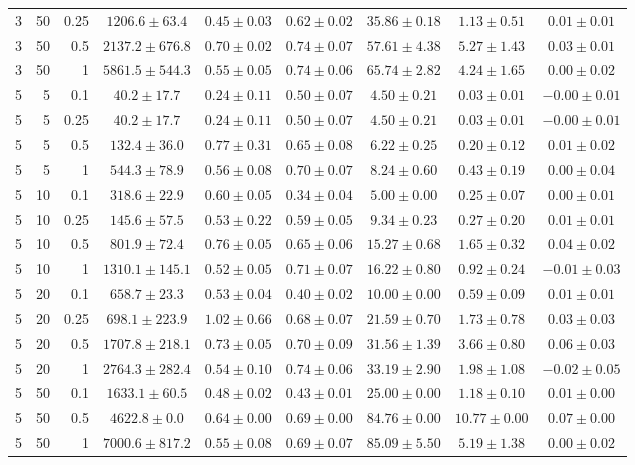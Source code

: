 \begin{table}[htbp]
\begin{tabular}{@{}rrrcccccc@{}}
3 & 50 & 0.25 & $1206.6 \pm 63.4$ & $0.45 \pm 0.03$ & $0.62 \pm 0.02$ & $35.86 \pm 0.18$ & $1.13 \pm 0.51$ & $0.01 \pm 0.01$ \\
3 & 50 & 0.5 & $2137.2 \pm 676.8$ & $0.70 \pm 0.02$ & $0.74 \pm 0.07$ & $57.61 \pm 4.38$ & $5.27 \pm 1.43$ & $0.03 \pm 0.01$ \\
3 & 50 & 1 & $5861.5 \pm 544.3$ & $0.55 \pm 0.05$ & $0.74 \pm 0.06$ & $65.74 \pm 2.82$ & $4.24 \pm 1.65$ & $0.00 \pm 0.02$ \\
\midrule
5 & 5 & 0.1 & $40.2 \pm 17.7$ & $0.24 \pm 0.11$ & $0.50 \pm 0.07$ & $4.50 \pm 0.21$ & $0.03 \pm 0.01$ & $-0.00 \pm 0.01$ \\
5 & 5 & 0.25 & $40.2 \pm 17.7$ & $0.24 \pm 0.11$ & $0.50 \pm 0.07$ & $4.50 \pm 0.21$ & $0.03 \pm 0.01$ & $-0.00 \pm 0.01$ \\
5 & 5 & 0.5 & $132.4 \pm 36.0$ & $0.77 \pm 0.31$ & $0.65 \pm 0.08$ & $6.22 \pm 0.25$ & $0.20 \pm 0.12$ & $0.01 \pm 0.02$ \\
5 & 5 & 1 & $544.3 \pm 78.9$ & $0.56 \pm 0.08$ & $0.70 \pm 0.07$ & $8.24 \pm 0.60$ & $0.43 \pm 0.19$ & $0.00 \pm 0.04$ \\
5 & 10 & 0.1 & $318.6 \pm 22.9$ & $0.60 \pm 0.05$ & $0.34 \pm 0.04$ & $5.00 \pm 0.00$ & $0.25 \pm 0.07$ & $0.00 \pm 0.01$ \\
5 & 10 & 0.25 & $145.6 \pm 57.5$ & $0.53 \pm 0.22$ & $0.59 \pm 0.05$ & $9.34 \pm 0.23$ & $0.27 \pm 0.20$ & $0.01 \pm 0.01$ \\
5 & 10 & 0.5 & $801.9 \pm 72.4$ & $0.76 \pm 0.05$ & $0.65 \pm 0.06$ & $15.27 \pm 0.68$ & $1.65 \pm 0.32$ & $0.04 \pm 0.02$ \\
5 & 10 & 1 & $1310.1 \pm 145.1$ & $0.52 \pm 0.05$ & $0.71 \pm 0.07$ & $16.22 \pm 0.80$ & $0.92 \pm 0.24$ & $-0.01 \pm 0.03$ \\
5 & 20 & 0.1 & $658.7 \pm 23.3$ & $0.53 \pm 0.04$ & $0.40 \pm 0.02$ & $10.00 \pm 0.00$ & $0.59 \pm 0.09$ & $0.01 \pm 0.01$ \\
5 & 20 & 0.25 & $698.1 \pm 223.9$ & $1.02 \pm 0.66$ & $0.68 \pm 0.07$ & $21.59 \pm 0.70$ & $1.73 \pm 0.78$ & $0.03 \pm 0.03$ \\
5 & 20 & 0.5 & $1707.8 \pm 218.1$ & $0.73 \pm 0.05$ & $0.70 \pm 0.09$ & $31.56 \pm 1.39$ & $3.66 \pm 0.80$ & $0.06 \pm 0.03$ \\
5 & 20 & 1 & $2764.3 \pm 282.4$ & $0.54 \pm 0.10$ & $0.74 \pm 0.06$ & $33.19 \pm 2.90$ & $1.98 \pm 1.08$ & $-0.02 \pm 0.05$ \\
5 & 50 & 0.1 & $1633.1 \pm 60.5$ & $0.48 \pm 0.02$ & $0.43 \pm 0.01$ & $25.00 \pm 0.00$ & $1.18 \pm 0.10$ & $0.01 \pm 0.00$ \\
5 & 50 & 0.5 & $4622.8 \pm 0.0$ & $0.64 \pm 0.00$ & $0.69 \pm 0.00$ & $84.76 \pm 0.00$ & $10.77 \pm 0.00$ & $0.07 \pm 0.00$ \\
5 & 50 & 1 & $7000.6 \pm 817.2$ & $0.55 \pm 0.08$ & $0.69 \pm 0.07$ & $85.09 \pm 5.50$ & $5.19 \pm 1.38$ & $0.00 \pm 0.02$ \\
\bottomrule
\end{tabular}
\end{table}
